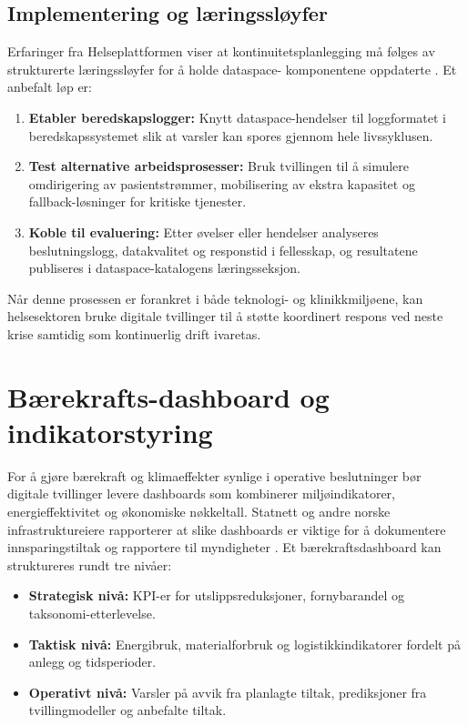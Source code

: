 \subsection{Implementering og læringssløyfer}
Erfaringer fra Helseplattformen viser at kontinuitetsplanlegging må følges av strukturerte læringssløyfer for å holde dataspace-
komponentene oppdaterte \citep{helseplattformen2023kontinuitet}. Et anbefalt løp er:
\begin{enumerate}
    \item \textbf{Etabler beredskapslogger:} Knytt dataspace-hendelser til loggformatet i beredskapssystemet slik at varsler kan
    spores gjennom hele livssyklusen.
    \item \textbf{Test alternative arbeidsprosesser:} Bruk tvillingen til å simulere omdirigering av pasientstrømmer, mobilisering
    av ekstra kapasitet og fallback-løsninger for kritiske tjenester.
    \item \textbf{Koble til evaluering:} Etter øvelser eller hendelser analyseres beslutningslogg, datakvalitet og responstid i
    fellesskap, og resultatene publiseres i dataspace-katalogens læringsseksjon.
\end{enumerate}
Når denne prosessen er forankret i både teknologi- og klinikkmiljøene, kan helsesektoren bruke digitale tvillinger til å støtte
koordinert respons ved neste krise samtidig som kontinuerlig drift ivaretas.

\section{Bærekrafts-dashboard og indikatorstyring}
For å gjøre bærekraft og klimaeffekter synlige i operative beslutninger bør digitale tvillinger levere dashboards som kombinerer
miljøindikatorer, energieffektivitet og økonomiske nøkkeltall. Statnett og andre norske infrastruktureiere rapporterer at slike
dashboards er viktige for å dokumentere innsparingstiltak og rapportere til myndigheter \citep{statnett2024baerekraft}. Et
bærekraftsdashboard kan struktureres rundt tre nivåer:
\begin{itemize}
    \item \textbf{Strategisk nivå:} KPI-er for utslippsreduksjoner, fornybarandel og taksonomi-etterlevelse.
    \item \textbf{Taktisk nivå:} Energibruk, materialforbruk og logistikkindikatorer fordelt på anlegg og tidsperioder.
    \item \textbf{Operativt nivå:} Varsler på avvik fra planlagte tiltak, prediksjoner fra tvillingmodeller og anbefalte tiltak.
\end{itemize}

